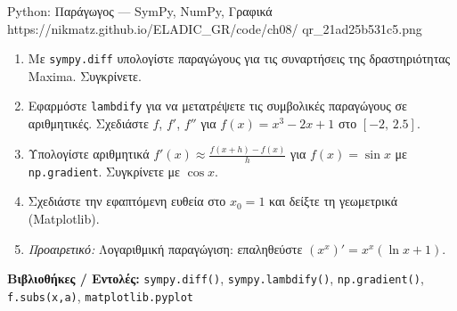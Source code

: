 \begin{pybox}{Python: Παράγωγος — SymPy, NumPy, Γραφικά}%
             {https://nikmatz.github.io/ELADIC_GR/code/ch08/}%
             {qr_21ad25b531c5.png}
\label{py:ch8_derivatives}
\begin{enumerate}[label=(\alph*),itemsep=2pt]
  \item Με \texttt{sympy.diff} υπολογίστε παραγώγους για τις
    συναρτήσεις της δραστηριότητας Maxima. Συγκρίνετε.
  \item Εφαρμόστε \texttt{lambdify} για να μετατρέψετε τις
    συμβολικές παραγώγους σε αριθμητικές. Σχεδιάστε $f$, $f'$,
    $f''$ για $f(x)=x^3-2x+1$ στο $[-2,\,2.5]$.
  \item Υπολογίστε αριθμητικά $f'(x) \approx \frac{f(x+h)-f(x)}{h}$
    για $f(x)=\sin x$ με \texttt{np.gradient}. Συγκρίνετε με $\cos x$.
  \item Σχεδιάστε την εφαπτόμενη ευθεία στο $x_0=1$ και
    δείξτε τη γεωμετρικά (Matplotlib).
  \item \textit{Προαιρετικό:} Λογαριθμική παραγώγιση:
    επαληθεύστε $(x^x)' = x^x(\ln x+1)$.
\end{enumerate}
\medskip
\textbf{Βιβλιοθήκες / Εντολές:}
\texttt{sympy.diff()}, \texttt{sympy.lambdify()},
\texttt{np.gradient()}, \texttt{f.subs(x,a)},
\texttt{matplotlib.pyplot}
\end{pybox}
